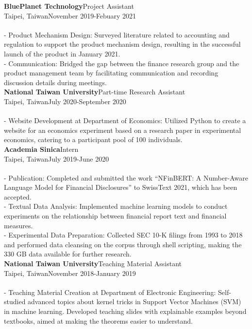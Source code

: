 \documentclass{article}
\begin{document}
\noindent\textbf{BluePlanet Technology}\hfill Project Assistant\\
Taipei, Taiwan\hfill November 2019-Febuary 2021\\\\
- Product Mechanism Design: Surveyed literature related to accounting and regulation to support the product mechanism design, resulting in the successful launch of the product in January 2021.\\ - Communication: Bridged the gap between the finance research group and the product management team by facilitating communication and recording discussion details during meetings.\\

\noindent\textbf{National Taiwan University}\hfill Part-time Research Assistant\\
Taipei, Taiwan\hfill July 2020-September 2020\\\\
- Website Development at Department of Economics: Utilized Python to create a website for an economics experiment based on a research paper in experimental economics, catering to a participant pool of 100 individuals.\\

\noindent\textbf{Academia Sinica}\hfill Intern\\
Taipei, Taiwan\hfill July 2019-June 2020\\\\
- Publication: Completed and submitted the work ``NFinBERT: A Number-Aware Language Model for Financial Disclosures'' to SwissText 2021, which has been accepted.\\ - Textual Data Analysis: Implemented machine learning models to conduct experiments on the relationship between financial report text and financial measures.\\ - Experimental Data Preparation: Collected SEC 10-K filings from 1993 to 2018 and performed data cleansing on the corpus through shell scripting, making the 330 GB data available for further research.\\

\noindent\textbf{National Taiwan University}\hfill Teaching Material Assistant\\
Taipei, Taiwan\hfill November 2018-January 2019\\\\
- Teaching Material Creation at Department of Electronic Engineering: Self-studied advanced topics about kernel tricks in Support Vector Machines (SVM) in machine learning. Developed teaching slides with explainable examples beyond textbooks, aimed at making the theorems easier to understand.\\
\end{document}
